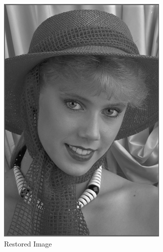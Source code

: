 \documentclass{article}
\begin{document}
\begin{figure}[!htb]
\begin{subfigure}{0.3\textwidth}
					\includegraphics[width=0.9\textwidth]{img03y_1.png}
					\caption{Restored Image}
				\end{subfigure}
				\begin{subfigure}{0.3\textwidth}

\end{subfigure}
\end{figure}
\end{document}
